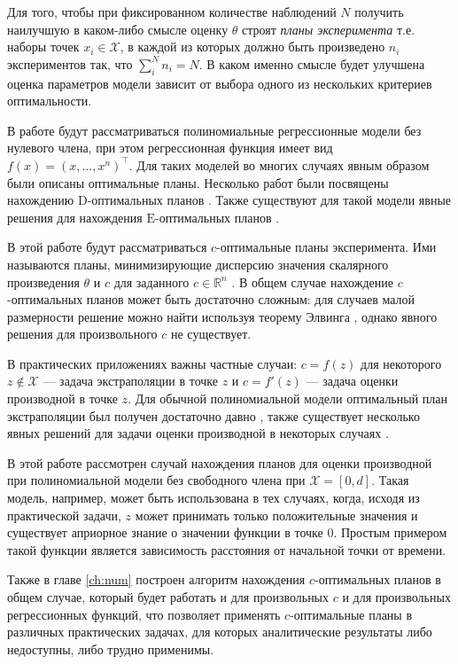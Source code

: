 \documentclass[specialist,
               substylefile = spbu.rtx,
               subf,href,colorlinks=true, 12pt]{disser}
\theoremstyle{definition}
\begin{document}
  Для того, чтобы при фиксированном количестве наблюдений $N$ получить наилучшую в каком-либо смысле оценку $\theta$ строят \textit{планы эксперимента} т.е. наборы точек $x_i \in \mathcal{X}$, в каждой из которых должно быть произведено $n_i$ экспериментов так, что $\sum^N_i n_i = N$. В каком именно смысле будет улучшена оценка параметров модели зависит от выбора одного из нескольких критериев оптимальности.
  
  В работе будут рассматриваться полиномиальные регрессионные модели без нулевого члена, при этом регрессионная функция имеет вид $f(x) = (x, \ldots, x^n)^\top$. Для таких моделей во многих случаях явным образом были описаны оптимальные планы. Несколько работ были посвящены нахождению $\mathrm{D}$-оптимальных планов \cite{hoel1958, studden1980, dette1990, dette2001}. Также существуют для такой модели явные решения для нахождения $\mathrm{E}$-оптимальных планов \cite{pukelsheim1993, dette1993, heiligers1994, dette1993_2}.
  
  В этой работе будут рассматриваться $c$-оптимальные планы эксперимента. Ими называются планы, минимизирующие дисперсию значения скалярного произведения $\theta$ и $c$ для заданного $c \in \mathbb{R}^n$ \cite{dette1993_2}. В общем случае нахождение $c$-оптимальных планов может быть достаточно сложным: для случаев малой размерности решение можно найти используя теорему Элвинга \cite{elfving1952}, однако явного решения для произвольного $c$ не существует.
  
  В практических приложениях важны частные случаи: $c = f(z)$ для некоторого $z \notin \mathcal{X}$ --- задача экстраполяции в точке $z$ и $c = f'(z)$ --- задача оценки производной в точке $z$. Для обычной полиномиальной модели оптимальный план экстраполяции был получен достаточно давно \cite{hoel1964}, также существует несколько явных решений для задачи оценки производной в некоторых случаях \cite{melas2010, melasmain}.
  
  В этой работе рассмотрен случай нахождения планов для оценки производной при полиномиальной модели без свободного члена при $\mathcal{X} = [0, d]$. Такая модель, например, может быть использована в тех случаях, когда, исходя из практической задачи, $z$ может принимать только положительные значения и существует априорное знание о значении функции в точке 0. Простым примером такой функции является зависимость расстояния от начальной точки от времени.
  
  Также в главе \ref{ch:num} построен алгоритм нахождения $c$-оптимальных планов в общем случае, который будет работать и для произвольных $c$ и для произвольных регрессионных функций, что позволяет применять $c$-оптимальные планы в различных практических задачах, для которых аналитические результаты либо недоступны, либо трудно применимы.
\end{document}
